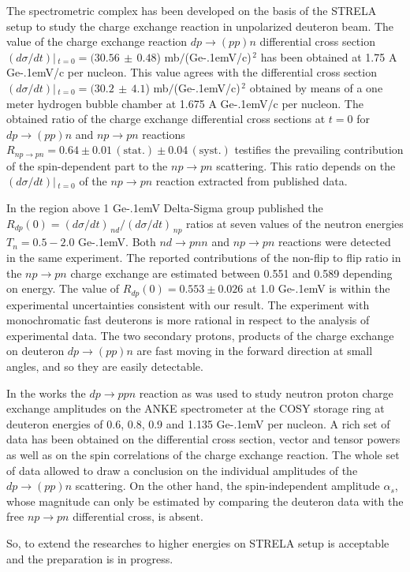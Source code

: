 \documentclass[twocolumn,epjc3]{svjour3}
\newcommand{\np}     {\ensuremath{np \rightarrow pn}\xspace}
\newcommand{\dpfrag} {\ensuremath{dp \rightarrow ppn}\xspace}
\newcommand{\dpchex} {\ensuremath{dp \rightarrow (pp)n}\xspace}
\newcommand{\GeVc}   {Ge\kern-.1emV/c\xspace}
\newcommand{\GeV}    {Ge\kern-.1emV\xspace}
\begin{document}
The spectrometric complex has been developed on the basis of the STRELA setup to
study the charge exchange reaction in unpolarized deuteron beam. The value of
the charge exchange reaction \dpchex differential cross section
$(d\sigma/dt)|\,_{t=0}=(30.56\,\pm\,0.48$) mb$/$(\GeVc)$^{\,2}$ has been
obtained at 1.75 A \GeVc per nucleon.  This value agrees with the differential
cross section $(d\sigma/dt)|\,_{t=0}=(30.2\,\pm\,4.1$) mb$/$(\GeVc)$^{\,2}$
obtained by means of a one meter hydrogen bubble chamber at 1.675 A \GeVc per
nucleon. The obtained ratio of the charge exchange differential cross sections
at $t=0$ for \dpchex and \np reactions
$R_{\np} = 0.64 \pm 0.01\,\mathrm{(stat.)} \pm 0.04\,\mathrm{(syst.)}$ testifies
the prevailing contribution of the spin-dependent part to the \np scattering.
This ratio depends on the $(d\sigma/dt)|\,_{t=0}$ of the \np reaction extracted
from published data.

In the region above 1 \GeV Delta-Sigma group published the
$R_{dp}(0) = (d\sigma/dt)_{\,nd} / (d\sigma/dt)_{\,np}$ ratios
\cite{sha09,sha09_2,shi11} at seven values of the neutron energies
$T_n = 0.5 - 2.0$ \GeV. Both $nd \rightarrow pnn$ and \np reactions were
detected in the same experiment. The reported contributions of the non-flip to
flip ratio in the \np charge exchange are estimated between 0.551 and 0.589
depending on energy. The value of $R_{dp}(0) = 0.553 \pm 0.026$ at 1.0 \GeV
\cite{sha09} is within the experimental uncertainties consistent with our
result. The experiment with monochromatic fast deuterons is more rational in
respect to the analysis of experimental data. The two secondary protons,
products of the charge exchange on deuteron \dpchex are fast moving in the
forward direction at small angles, and so they are easily detectable.

In the works \cite{chi09,mch13} the \dpfrag reaction as was used to study
neutron proton charge exchange amplitudes on the ANKE spectrometer at the COSY
storage ring at deuteron energies of 0.6, 0.8, 0.9 and 1.135 \GeV per nucleon. A
rich set of data has been obtained on the differential cross section, vector and
tensor powers as well as on the spin correlations of the charge exchange
reaction. The whole set of data allowed to draw a conclusion on the individual
amplitudes of the \dpchex scattering. On the other hand, the spin-independent
amplitude $\alpha_s$, whose magnitude can only be estimated by comparing the
deuteron data with the free \np differential cross, is absent.

So, to extend the researches to higher energies on STRELA setup is acceptable
and the preparation is in progress.
\end{document}
